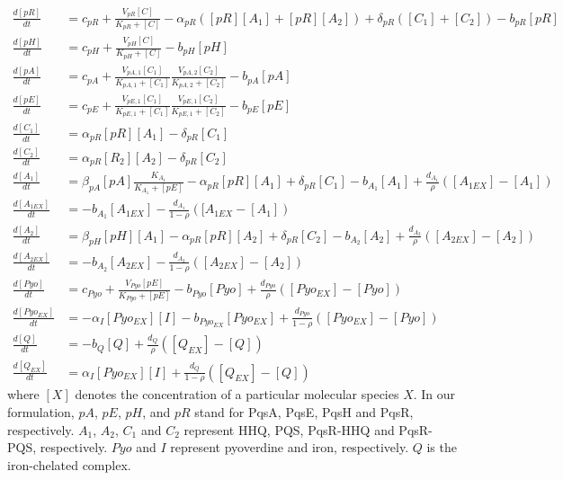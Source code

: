 \documentclass[runningheads]{llncs}
\begin{document}
\vspace{-15pt}
\begingroup\makeatletter{}\check@mathfonts
\def\maketag@@@#1{\hbox{\m@th\small\normalfont#1}}
\begin{align}
\frac{d[pR]}{dt} &=  c_{pR} + \frac{V_{pR} [C]}{K_{pR} + [C]} \!-\! \alpha_{pR} ( [pR][A_1] + [pR][A_2] )  \!+\! \delta_{pR} ( [C_1] +  [C_2] )\! -\!b_{pR} [pR]   \\
\frac{d[pH]}{dt} &=  c_{pH} + \frac{V_{pH} [C]}{K_{pH} + [C]} -b_{pH} [pH]   \\
\frac{d[pA]}{dt}  &=  c_{pA} + \frac{V_{pA,1} [C_1]}{K_{pA,1} + [C_1]} \frac{V_{pA,2} [C_2]}{K_{pA,2} + [C_2]}  -b_{pA} [pA]   \\
\frac{d[pE]}{dt} &=  c_{pE}  +  \frac{V_{pE, 1} [C_1]}{K_{pE, 1} + [C_1]} \frac{V_{pE, 1} [C_2]}{K_{pE, 1} + [C_2]} -b_{pE} [pE] \\
\frac{d[C_1]}{dt} &= \alpha_{pR} [pR] [A_1] - \delta_{pR} [C_1] \\ 
\frac{d[C_2]}{dt} &= \alpha_{pR} [R_2][A_2] - \delta_{pR} [C_2] \\ 
\frac{d[A_1]}{dt} &=   \beta_{pA} [pA]\frac{K_{A_1}}{K_{A_1} \!+ \! [pE]} \! - \! \alpha_{pR} [pR][A_1] \!+\! \delta_{pR} [C_1]  \!-\! b_{A_1} [A_1] \! + \!\frac{d_{A_1}}{\rho} ([A_{1EX}] \!-\! [A_1]) \\ 
\frac{d[A_{1EX}]}{dt} &=  -  b_{A_1} [A_{1EX}] -\frac{d_{A_1}}{1-\rho} ( [A_{1EX}  - [A_1])  \\ 
\frac{d[A_2]}{dt} &= \beta_{pH} [pH] [A_1] \! -\! \alpha_{pR} [pR][A_2] + \delta_{pR} [C_2] - b_{A_2} [A_2]   +\frac{d_{A_2}}{\rho} ([A_{2EX}] - [A_2]) \\ 
\frac{d[A_{2EX}]}{dt} &= -  b_{A_2} [A_{2EX}]  -\frac{d_{A_2}}{1 - \rho} ([A_{2EX}]  - [A_2])   \\ 
\frac{d[Pyo]}{dt} &=   c_{Pyo} + \frac{V_{Pyo}  [pE]}{K_{Pyo} + [pE]} - b_{Pyo} [Pyo] +  \frac{d_{Pyo}}{\rho} ([Pyo_{EX}] -[Pyo])   \\
\label{Irona}  
\frac{d[Pyo_{EX}]}{dt} &=  - \alpha_{I} [Pyo_{EX}][I] - b_{Pyo_{EX}} [Pyo_{EX}] + \frac{d_{Pyo}}{1 - \rho} ([Pyo_{EX}] - [Pyo])\\ 
\frac{d[Q]}{dt} &= - b_{Q} [Q]  + \frac{d_Q}{\rho} ([Q_{EX}] - [Q]) \\ 
\frac{d[Q_{EX}]}{dt}  &=  \alpha_{I} [Pyo_{EX}][I] + \frac{d_{Q}}{1 - \rho} ([Q_{EX}] - [Q])   
\label{QS_end}
\end{align}\endgroup
where $[X]$ denotes the concentration of a particular molecular species $X$. In our formulation, $pA$, $pE$, $pH$, and $pR$ stand for PqsA, PqsE, PqsH and PqsR, respectively. $A_1$, $A_2$, $C_1$ and $C_2$ represent HHQ, PQS, PqsR-HHQ and PqsR-PQS, respectively. $Pyo$ and $I$ represent pyoverdine and iron, respectively. $Q$ is the iron-chelated complex. 
\end{document}
